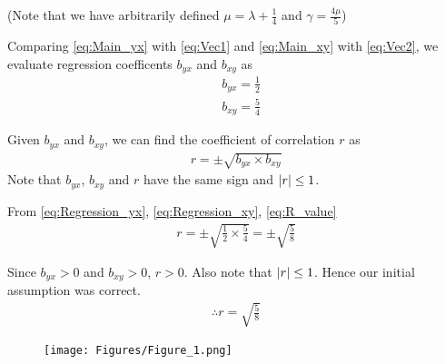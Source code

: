 \documentclass[journal,12pt,twocolumn]{IEEEtran}
\begin{document}
(Note that we have arbitrarily defined $\mu = \lambda + \frac{1}{4}$ and $\gamma = \frac{4\mu}{5}$)

Comparing
\eqref{eq:Main_yx} with \eqref{eq:Vec1}
and
\eqref{eq:Main_xy} with \eqref{eq:Vec2},
we evaluate regression coefficents $b_{yx}$ and $b_{xy}$ as
\begin{align}
  &b_{yx} = \frac{1}{2}
  \label{eq:Regression_yx}
  \\
  &b_{xy} = \frac{5}{4}
  \label{eq:Regression_xy}
\end{align}

Given $b_{yx}$ and $b_{xy}$, we can find the coefficient of correlation $r$ as
\begin{align}
  r = \pm\sqrt{b_{yx} \times b_{xy}}
  \label{eq:R_value}
\end{align}
Note that $b_{yx}$, $b_{xy}$ and $r$ have the same sign and $\left\vert r\right\vert \le 1$.

From
\eqref{eq:Regression_yx},
\eqref{eq:Regression_xy},
\eqref{eq:R_value}
\begin{align}
  r = \pm \sqrt{\frac{1}{2} \times \frac{5}{4}} = \pm \sqrt{\frac{5}{8}}
\end{align}

Since $b_{yx} > 0$ and $b_{xy} > 0$, $r > 0$. Also note that $\left\vert r\right\vert \le 1$. Hence our initial assumption was correct.
\begin{align}
  \therefore r = \sqrt{\frac{5}{8}}
\end{align}

\begin{figure}[!ht]
  \centering
  \texttt{[image: Figures/Figure\_1.png]}
  \label{Figure_1}
\end{figure}
\end{document}
